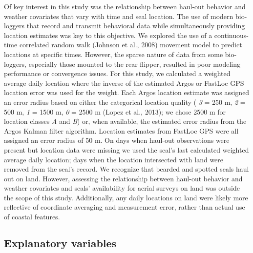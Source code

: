 \documentclass[fleqn,10pt,lineno]{wlpeerj} %
\begin{document}
Of key interest in this study was the relationship between haul-out behavior and
weather covariates that vary with time and seal location. The use of modern
bio-loggers that record and transmit behavioral data while simultaneously
providing location estimates was key to this objective. We explored the use
of a continuous-time correlated random walk (Johnson et al., 2008) movement model
to predict locations at specific times. However, the sparse nature of data from
some bio-loggers, especially those mounted to the rear flipper, resulted in poor
modeling performance or convergence issues. For this study, we calculated a
weighted average daily location where the inverse of the estimated Argos or
FastLoc GPS location error was used for the weight. Each Argos location estimate
was assigned an error radius based on either the categorical location quality (
\emph{3} = 250 m, \emph{2} = 500 m, \emph{1} = 1500 m, \emph{0} = 2500 m (Lopez et al., 2013); we chose 2500 m for
location classes \emph{A} and \emph{B}) or, when available, the estimated error radius
from the Argos Kalman filter algorithm. Location estimates from FastLoc GPS were
all assigned an error radius of 50 m. On days when haul-out observations were
present but location data were missing we used the seal's last calculated weighted
average daily location; days when the location intersected with land
were removed from the seal's record. We recognize that bearded and spotted
seals haul out on land. However, assessing the relationship between haul-out
behavior and weather covariates and seals' availability for aerial surveys on
land was outside the scope of this study. Additionally, any daily locations on
land were likely more reflective of coordinate averaging and measurement error,
rather than actual use of coastal features.

\subsection*{Explanatory variables}\label{explanatory-variables}
\end{document}
